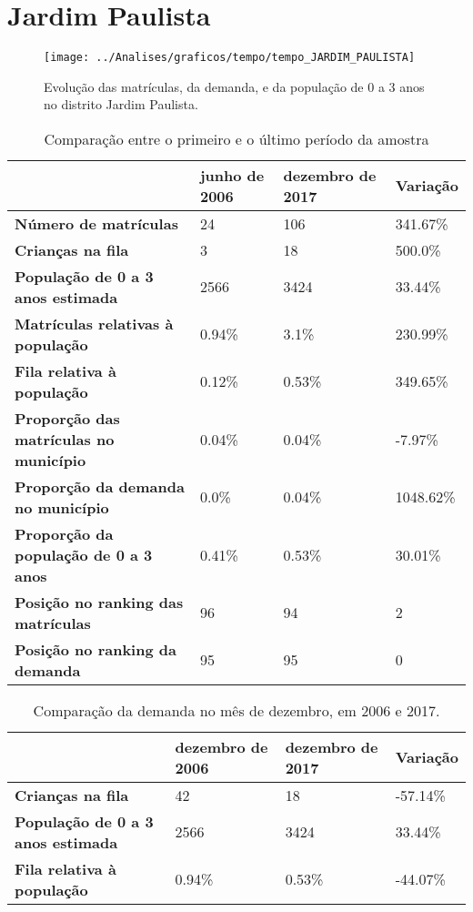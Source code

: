 \section{Jardim Paulista}
\begin{figure}[H]
\centering
\texttt{[image: ../Analises/graficos/tempo/tempo\_JARDIM\_PAULISTA]}
\caption{Evolução das matrículas, da demanda, e da população de 0 a 3 anos no distrito Jardim Paulista.}
\end{figure}
\begin{table}[H]
\begin{tabular}{|l|l|l|l|}
\hline
\textbf{}                                      & \textbf{junho de 2006}       & \textbf{dezembro de 2017}    & \textbf{Variação} \\ \hline
\textbf{Número de matrículas}                  & 24 & 106 & 341.67\% \\ \hline
\textbf{Crianças na fila}                      & 3 & 18 & 500.0\% \\ \hline
\textbf{População de 0 a 3 anos estimada}      & 2566 & 3424 & 33.44\% \\ \hline
\textbf{Matrículas relativas à população}      & 0.94\% & 3.1\% & 230.99\% \\ \hline
\textbf{Fila relativa à população}             & 0.12\% & 0.53\% & 349.65\% \\ \hline
\textbf{Proporção das matrículas no município} & 0.04\% & 0.04\% & -7.97\% \\ \hline
\textbf{Proporção da demanda no município}     & 0.0\% & 0.04\% & 1048.62\% \\ \hline
\textbf{Proporção da população de 0 a 3 anos}  & 0.41\% & 0.53\% & 30.01\% \\ \hline
\textbf{Posição no ranking das matrículas}     & 96 & 94 & 2 \\ \hline
\textbf{Posição no ranking da demanda}         & 95 & 95 & 0 \\ \hline
\end{tabular}
\caption{Comparação entre o primeiro e o último período da amostra}
\end{table}
\begin{table}[H]
\begin{tabular}{|l|l|l|l|}
\hline
\textbf{}                                 & \textbf{dezembro de 2006} & \textbf{dezembro de 2017} & \textbf{Variação} \\ \hline
\textbf{Crianças na fila}                      & 42 & 18 & -57.14\% \\ \hline
\textbf{População de 0 a 3 anos estimada}      & 2566 & 3424 & 33.44\% \\ \hline
\textbf{Fila relativa à população}             & 0.94\% & 0.53\% & -44.07\% \\ \hline
\end{tabular}
\caption{Comparação da demanda no mês de dezembro, em 2006 e 2017.}
\end{table}

